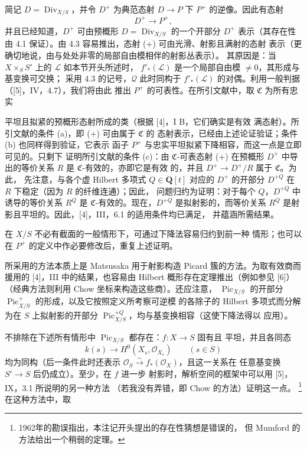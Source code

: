 简记 $D=\operatorname{Div}_{X/S}$，并令 $D^+$ 为典范态射
$D\longrightarrow P$ 下 $P^+$ 的逆像。因此有态射
\begin{equation}
D^+\longrightarrow P^+,
\tag{+}
\end{equation}
并且已经知道，$D^+$ 可由预概形
$D=\operatorname{Div}_{X/S}$ 的一个开部分 $D^+$ 表示（其存在性由
4.1 保证）。由 4.3 容易推出，态射 (+) 可由光滑、射影且满射的态射
表示（更确切地说，由与处处非零的局部自由模相伴的射影丛表示）。
其原因是：当 $X\times_SS'$ 上的 $\mathcal L$ 如本节开头所述时，
$f'_*(\mathcal L)$ 是一个局部自由模 $\neq0$，其形成与基变换可交换；
采用 4.3 的记号，$\mathcal Q$ 此时同构于
$f'_*(\mathcal L)$ 的对偶。利用一般判据（[5]，IV，4.7），我们将由此
推出 $P^+$ 的可表性。在所引文献中，取 $\mathfrak C$ 为所有忠实

平坦且拟紧的预概形态射所成的类（根据 [4]，I B，它们确实是有效
满态射）。所引文献的条件 (a)，即 (+) 可由属于 $\mathfrak C$ 的
态射表示，已经由上述论证验证；条件 (b) 也同样得到验证，它表示
函子 $P^+$ 与忠实平坦拟紧下降相容，而这一点是立即可见的。只剩下
证明所引文献的条件 (c)：由 $\mathfrak C$-可表态射 (+) 在预概形
$D^+$ 中导出的等价关系 $R$ 是 $\mathfrak C$-有效的，亦即它是有效
的，并且 $D^+\longrightarrow D^+/R$ 属于 $\mathfrak C$。为此，
先注意，与各个虚 Hilbert 多项式 $Q\in\mathbf Q[t]$ 对应的 $D^+$
的开部分 $D^{+Q}$ 在 $R$ 下稳定（因为 $R$ 的纤维连通）；因此，
问题归约为证明：对于每个 $Q$，$D^{+Q}$ 中诱导的等价关系 $R^Q$
是 $\mathfrak C$-有效的。现在，$D^{+Q}$ 是拟射影的，而等价关系
$R^Q$ 是射影且平坦的。因此，[4]，III，6.1 的适用条件均已满足，
并蕴涵所需结果。

在 $X/S$ 不必有截面的一般情形下，可通过下降法容易归约到前一种
情形；也可以在 $P^+$ 的定义中作必要修改后，重复上述证明。

 所采用的方法本质上是 Matsusaka 用于射影构造
Picard 簇的方法。为取有效商而援用的 [4]，III 中的结果，也容易由
Hilbert 概形存在定理推出（例如参见 [6]）（经典方法则利用 Chow
坐标来构造这些商）。还应注意，
$\operatorname{Pic}_{X/S}$ 的开部分
$\operatorname{Pic}^{+}_{X/S}$ 的形成，以及它按照定义所考察可逆模
的各除子的 Hilbert 多项式而分解为在 $S$ 上拟射影的开部分
$\operatorname{Pic}^{+Q}_{X/S}$，均与基变换相容（这使下降法得以
应用）。

 不排除在下述所有情形中
$\operatorname{Pic}_{X/S}$ 都存在：$f:X\longrightarrow S$ 固有且
平坦，并且各同态
\[
k(s)\longrightarrow H^0(X_s,\mathcal O_{X_s})\qquad(s\in S)
\]
均为同构（后一条件此时还表示
$\mathcal O_S\xrightarrow{\sim}f_*(\mathcal O_X)$，且这一关系在
任意基变换 $S'\longrightarrow S$ 后仍成立）。至少，在 $f$ 进一步
射影时，解析空间的框架中可以用 [5]，IX，3.1 所说明的另一种方法
（若我没有弄错，即 Chow 的方法）证明这一点。
\footnote{1962年的勘误指出，本注记开头提出的存在性猜想是错误的，
但 Mumford 的方法给出一个稍弱的定理。}
在这种方法中，取

